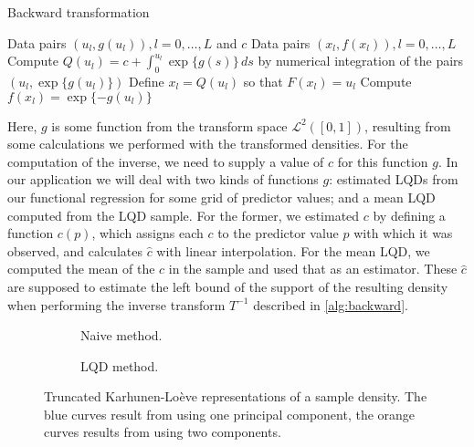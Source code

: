 \begin{algorithm}
    \caption{Backward transformation}
    \label{alg:backward}
    \begin{algorithmic}[1]
    \Require Data pairs \( (u_l, g(u_l)), l = 0, \ldots, L \) and \( c \)
    \Ensure Data pairs \( (x_l, f(x_l)), l = 0, \ldots, L \)
        \State Compute \( Q(u_l) = c + \int_{0}^{u_l} \exp\{g(s)\} \, ds \) by numerical integration of the pairs \( (u_l, \exp\{g(u_l)\}) \)
        \State Define \( x_l = Q(u_l) \) so that \( F(x_l) = u_l \)
        \State Compute \( f(x_l) = \exp \{-g(u_l)\} \)
    \EndFor
    \end{algorithmic}
\end{algorithm}

Here, $g$ is some function from the transform space $\mathcal{L}^2([0,1])$,
resulting from some calculations we performed with the transformed densities. For
the computation of the inverse, we need to supply a value of $c$ for this function $g$.
In our application we will deal with two kinds of functions $g$: estimated LQDs from
our functional regression for some grid of predictor values; and a mean LQD computed from
the LQD sample. For the former, we estimated $c$ by defining a function $c(p)$, which
assigns each $c$ to the predictor value $p$ with which it was observed, and calculates $\hat{c}$
with linear interpolation. For the mean LQD, we computed the mean of the $c$ in the sample
and used that as an estimator. These $\hat{c}$ are supposed to estimate the left bound
of the support of the resulting density when performing the inverse transform $T^{-1}$
described in \ref{alg:backward}.

\begin{figure}[h]
    \centering
    \begin{subfigure}[b]{0.45\textwidth}
        \centering
        \resizebox{\linewidth}{!}{}
        \caption[Truncated representation --- naive]{Naive method.}
        \label{fig:naive_trunc_rep}
    \end{subfigure}
    \hfill %
    \begin{subfigure}[b]{0.45\textwidth}
        \centering
        \resizebox{\linewidth}{!}{}
        \caption[Truncated representation --- LQD method]{LQD method.}
        \label{fig:trunc_rep}
    \end{subfigure}
    \caption[Truncated Karhunen-Loève representations]{Truncated Karhunen-Loève
    representations of a sample density. The blue curves result from using one principal
    component, the orange curves results from using two components.}
    \label{fig:trunc_reps}
\end{figure}

